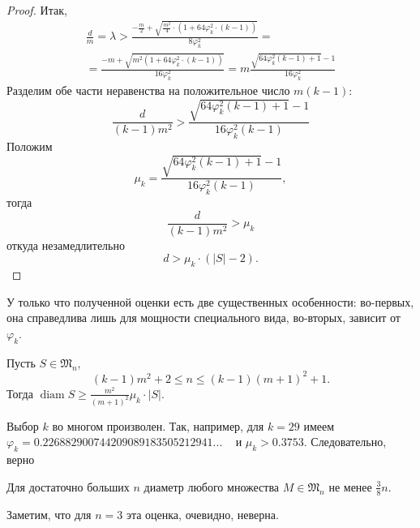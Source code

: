 \begin{proof}
	Итак,
	\begin{multline}
		\frac{d}{m} = \lambda >
		\frac{-\frac{m}{2} + \sqrt{\frac{m^2}{4} \cdot (1 + 64 \varphi_k^2 \cdot (k-1))} }{8 \varphi_k^2}
		=\\=
		\frac{-m + \sqrt{m^2  (1 + 64 \varphi_k^2 \cdot (k-1))} }{16 \varphi_k^2}
		=
		m\frac{ \sqrt{ 64 \varphi_k^2 (k-1) + 1} -1 }{16 \varphi_k^2}
	\end{multline}
	Разделим обе части неравенства на положительное число $m(k-1)$:
	\begin{equation}
		\frac{d}{(k-1)m^2}
		>
		\frac{ \sqrt{ 64 \varphi_k^2 (k-1) + 1} -1 }{16 \varphi_k^2 (k-1)}
	\end{equation}
	Положим
	\begin{equation}
		\mu_k = \frac{ \sqrt{ 64 \varphi_k^2 (k-1) + 1} -1 }{16 \varphi_k^2 (k-1)},
	\end{equation}
	тогда
	\begin{equation}
		\frac{d}{(k-1)m^2}
		>
		\mu_k
	\end{equation}
	откуда незамедлительно
	\begin{equation}
		d > \mu_k \cdot (|S|-2)
		.
	\end{equation}
\end{proof}

У только что полученной оценки есть две существенных особенности:
во-первых, она справедлива лишь для мощности специального вида,
во-вторых, зависит от $\varphi_k$.

\begin{corollary}
	\label{corollary:common_linear_bound}
	Пусть $S\in\mathfrak{M}_n$, $$ (k-1)m^2 + 2 \leq n \leq (k-1)(m+1)^2 + 1.$$
	Тогда $\operatorname{diam} S \geq \frac{m^2}{(m+1)^2} \mu_k \cdot |S|$.
\end{corollary}

Выбор $k$ во многом произволен.
Так, например, для $k=29$ имеем $\varphi_k=0.226882900744209089183505212941...$
~\cite{markot2005newverified}
и $\mu_k > 0.3753$.
Следовательно, верно
\begin{proposition}
	\label{proposition:linear_bound_29}
	Для достаточно больших $n$ диаметр любого множества $M\in\mathfrak{M}_n$ не менее $\frac{3}{8}n$.
\end{proposition}
Заметим, что для $n=3$ эта оценка, очевидно, неверна.

